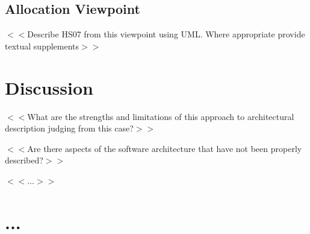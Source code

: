 \documentclass[a4paper,10pt]{article}
\begin{document}
\subsection{Allocation Viewpoint}

$<<$Describe HS07 from this viewpoint using UML. Where appropriate
provide textual supplements$>>$

\section{Discussion}
$<<$What are the strengths and limitations of this approach to
architectural description judging from this case?$>>$

$<<$Are there aspects of the software architecture that have not been
properly described?$>>$

$<<$...$>>$

\section{...}



\end{document}
